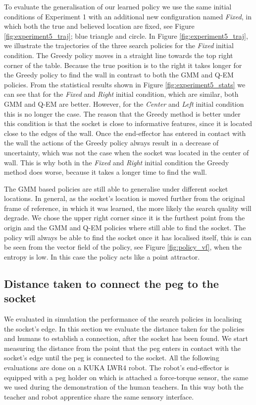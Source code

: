 To evaluate the generalisation of our learned policy we use the same initial conditions of Experiment 1 with an additional 
new configuration named \textit{Fixed}, in which both the true and believed location are fixed, 
see Figure \ref{fig:experiment5_traj}; blue triangle and circle. In Figure \ref{fig:experiment5_traj}, we illustrate the trajectories 
of the three search policies for the \textit{Fixed} initial condition. The Greedy policy moves in a straight line towards the top
right corner of the table. Because the true position is to the right it takes longer for the Greedy policy to find the wall 
in contrast to both the GMM and Q-EM policies. From the statistical results shown in Figure \ref{fig:experiment5_stats} we can see
that for the \textit{Fixed} and \textit{Right} initial condition, which are similar, both GMM and Q-EM are better. However, for 
the \textit{Center} and \textit{Left} initial condition this is no longer the case. 
The reason that the Greedy method is better under this condition is that the socket is close to informative features, since it 
is located close to the edges of the wall. Once the end-effector has entered in contact with the wall the actions of the Greedy 
policy always result in a decrease of uncertainty, which was not the case when the socket was located in the center of wall. 
This is why both in the \textit{Fixed} and \textit{Right} initial condition the Greedy method does worse, because it takes a longer
time to find the wall.

The GMM based policies are still able to generalise under different socket locations. In general, as the socket's location is moved 
further from the original frame of reference, in which it was learned, the more likely the search quality will degrade. We 
chose the upper right corner since it is the furthest point from the origin and the GMM and Q-EM policies where still able to find 
the socket. The policy will always be able to find the socket once it has localised itself, this is can be seen from the vector field 
of the policy, see Figure \ref{fig:policy_vf}, when the entropy is low. In this case the policy acts like a point attractor.

\subsection{Distance taken to connect the peg to the socket}
We evaluated in simulation the performance of the search policies in localising the socket's edge. In this
section we evaluate the distance taken for the policies and humans to establish a connection, after the socket 
has been found. We start measuring the distance 
from the point that the peg enters in contact with the socket's edge until the peg is connected to the socket. All the following evaluations are done 
on a KUKA LWR4 robot. The robot's end-effector is equipped with a peg holder on which is attached a force-torque sensor, 
the same we used during the demonstration of the human teachers. In this way both the teacher and robot apprentice share 
the same sensory interface.

